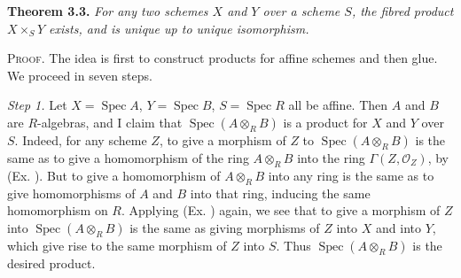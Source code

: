 {\medskip
\noindent\hypertarget{result-II-3.3}{}\textbf{Theorem 3.3.} \emph{For any two schemes $X$ and $Y$ over a scheme $S$, the fibred product $X\times_S Y$ exists, and is unique up to unique isomorphism.}

\smallskip
\noindent\textsc{Proof.} The idea is first to construct products for affine schemes and then glue. We proceed in seven steps.

\hypertarget{proof-II-3.3-step-1}{}\emph{Step 1.} Let $X=\operatorname{Spec}A$, $Y=\operatorname{Spec}B$, $S=\operatorname{Spec}R$ all be affine. Then $A$ and $B$ are $R$-algebras, and I claim that $\operatorname{Spec}(A\otimes_R B)$ is a product for $X$ and $Y$ over $S$. Indeed, for any scheme $Z$, to give a morphism of $Z$ to $\operatorname{Spec}(A\otimes_R B)$ is the same as to give a homomorphism of the ring $A\otimes_R B$ into the ring $\Gamma(Z,\mathcal O_Z)$, by (Ex. ). But to give a homomorphism of $A\otimes_R B$ into any ring is the same as to give homomorphisms of $A$ and $B$ into that ring, inducing the same homomorphism on $R$. Applying (Ex. ) again, we see that to give a morphism of $Z$ into $\operatorname{Spec}(A\otimes_R B)$ is the same as giving morphisms of $Z$ into $X$ and into $Y$, which give rise to the same morphism of $Z$ into $S$. Thus $\operatorname{Spec}(A\otimes_R B)$ is the desired product.}
